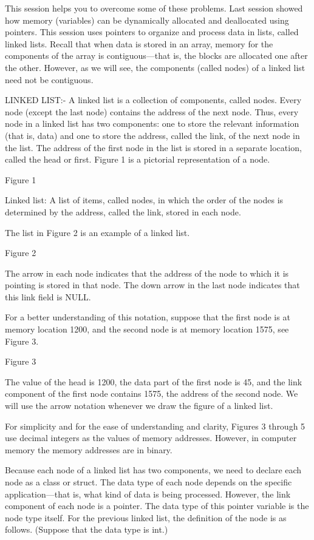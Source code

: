 \documentclass[11pt]{article}            %
\begin{document}
This session helps you to overcome some of these problems. Last session showed how memory (variables) can be dynamically allocated and deallocated using pointers.  This session uses pointers to organize and process data in lists, called linked lists. Recall that when data is stored in an array, memory for the components of the array is contiguous—that is, the blocks are allocated one after the other. However, as we will see, the components (called nodes) of a linked list need not be contiguous. 

LINKED LIST:-
A linked list is a collection of components, called nodes. Every node (except the last node) contains the address of the next node. Thus, every node in a linked list has two components: one to store the relevant information (that is, data) and one to store the address, called the link, of the next node in the list. The address of the first node in the list is stored in a separate location, called the head or first. Figure 1 is a pictorial representation of a node. 

 
Figure 1 


Linked list: A list of items, called nodes, in which the order of the nodes is determined by the address, called the link, stored in each node. 

The list in Figure 2 is an example of a linked list. 

 
Figure 2 

The arrow in each node indicates that the address of the node to which it is pointing is stored in that node. The down arrow in the last node indicates that this link field is NULL. 

For a better understanding of this notation, suppose that the first node is at memory location 
1200, and the second node is at memory location 1575, see Figure 
3. 

 Figure 3 


The value of the head is 1200, the data part of the first node is 45, and the link component of the first node contains 1575, the address of the second node.  We will use the arrow notation whenever we draw the figure of a linked list. 

For simplicity and for the ease of understanding and clarity, Figures 3 through 5 use decimal integers as the values of memory addresses.  However, in computer memory the memory addresses are in binary. 

Because each node of a linked list has two components, we need to declare each node as a class or struct. The data type of each node depends on the specific application—that is, what kind of data is being processed. However, the link component of each node is a pointer. The data type of this pointer variable is the node type itself. For the previous linked list, the definition of the node is as follows. (Suppose that the data type is int.) 
\end{document}
